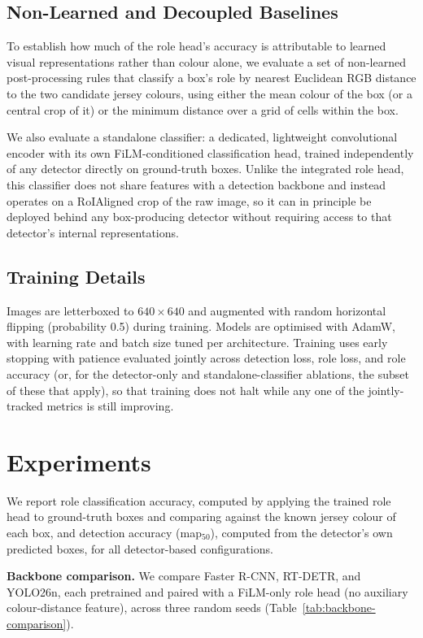 \documentclass{article}
\begin{document}
\subsection{Non-Learned and Decoupled Baselines}

To establish how much of the role head's accuracy is attributable to learned visual representations rather than colour alone, we evaluate a set of non-learned post-processing rules that classify a box's role by nearest Euclidean RGB distance to the two candidate jersey colours, using either the mean colour of the box (or a central crop of it) or the minimum distance over a grid of cells within the box.

We also evaluate a standalone classifier: a dedicated, lightweight convolutional encoder with its own FiLM-conditioned classification head, trained independently of any detector directly on ground-truth boxes. Unlike the integrated role head, this classifier does not share features with a detection backbone and instead operates on a RoIAligned crop of the raw image, so it can in principle be deployed behind any box-producing detector without requiring access to that detector's internal representations.

\subsection{Training Details}

Images are letterboxed to $640\times640$ and augmented with random horizontal flipping (probability 0.5) during training. Models are optimised with AdamW, with learning rate and batch size tuned per architecture. Training uses early stopping with patience evaluated jointly across detection loss, role loss, and role accuracy (or, for the detector-only and standalone-classifier ablations, the subset of these that apply), so that training does not halt while any one of the jointly-tracked metrics is still improving.

\section{Experiments}

We report role classification accuracy, computed by applying the trained role head to ground-truth boxes and comparing against the known jersey colour of each box, and detection accuracy (map$_{50}$), computed from the detector's own predicted boxes, for all detector-based configurations.

\textbf{Backbone comparison.} We compare Faster R-CNN, RT-DETR, and YOLO26n, each pretrained and paired with a FiLM-only role head (no auxiliary colour-distance feature), across three random seeds (Table~\ref{tab:backbone-comparison}).
\end{document}
